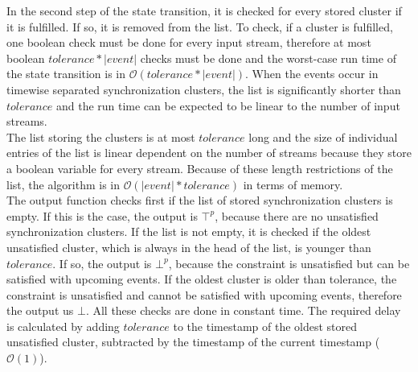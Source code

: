 	In the second step of the state transition, it is checked for every stored cluster if it is fulfilled. If so, it is removed from the list. To check, if a cluster is fulfilled, one boolean check must be done for every input stream, therefore at most boolean $tolerance*|event|$ checks must be done and the worst-case run time of the state transition is in $\mathcal{O}(tolerance * |event|)$. When the events occur in timewise separated synchronization clusters, the list is significantly shorter than $tolerance$ and the run time can be expected to be linear to the number of input streams.\\
	The list storing the clusters is at most $tolerance$ long and the size of individual entries of the list is linear dependent on the number of streams because they store a boolean variable for every stream. Because of these length restrictions of the list, the algorithm is in $\mathcal{O}(|event|*tolerance)$ in terms of memory.\\
	The output function checks first if the list of stored synchronization clusters is empty. If this is the case, the output is $\top^p$, because there are no unsatisfied synchronization clusters. If the list is not empty, it is checked if the oldest unsatisfied cluster, which is always in the head of the list, is younger than $tolerance$. If so, the output is $\bot^p$, because the constraint is unsatisfied but can be satisfied with upcoming events. If the oldest cluster is older than tolerance, the constraint is unsatisfied and cannot be satisfied with upcoming events, therefore the output us $\bot$. All these checks are done in constant time. The required delay is calculated by adding $tolerance$ to the timestamp of the oldest stored unsatisfied cluster, subtracted by the timestamp of the current timestamp ($\mathcal{O}(1)$).
	
